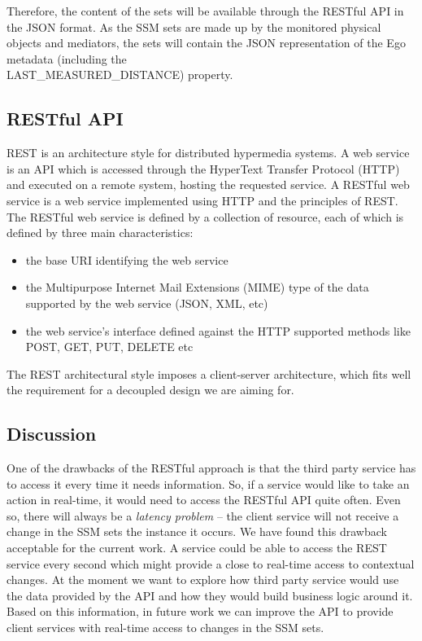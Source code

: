 Therefore, the content of the sets will be available through the RESTful API in the JSON format. As the SSM sets are made up by the monitored physical objects and mediators, the sets will contain the JSON representation of the Ego metadata (including the\\
LAST\_MEASURED\_DISTANCE) property.\\
\subsection{RESTful API} %
\label{sec:rest_api}
REST is an architecture style for distributed hypermedia systems. A web service is an API which is accessed through the HyperText Transfer Protocol (HTTP) and executed on a remote system, hosting the requested service. A RESTful web service is a web service implemented using HTTP and the principles of REST. The RESTful web service is defined by a collection of resource, each of which is defined by three main characteristics:
\begin{itemize}
	\item the base URI identifying the web service
	\item the Multipurpose Internet Mail Extensions (MIME) type of the data supported by the web service (JSON, XML, etc)
	\item the web service's interface defined against the HTTP supported methods like POST, GET, PUT, DELETE etc
\end{itemize}

The REST architectural style imposes a client-server architecture, which fits well the requirement for a decoupled design we are aiming for.\\

\subsection{Discussion} %
\label{sec:api_discussion}
One of the drawbacks of the RESTful approach is that the third party service has to access it every time it needs information. So, if a service would like to take an action in real-time, it would need to access the RESTful API quite often. Even so, there will always be a \emph{latency problem} -- the client service will not receive a change in the SSM sets the instance it occurs. We have found this drawback acceptable for the current work. A service could be able to access the REST service every second which might provide a close to real-time access to contextual changes. At the moment we want to explore how third party service would use the data provided by the API and how they would build business logic around it. Based on this information, in future work we can improve the API to provide client services with real-time access to changes in the SSM sets.\\ 

